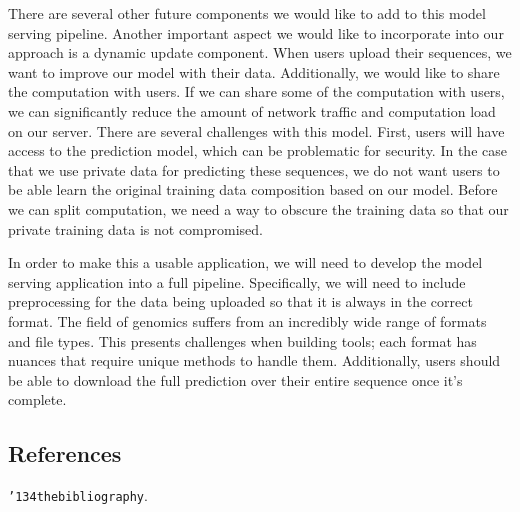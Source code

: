 \documentclass{sig-alternate-05-2015}
\begin{document}
There are several other future components we would like to add to this model serving pipeline. Another important aspect we would like to incorporate into our approach is a dynamic update component. When users upload their sequences, we want to improve our model with their data. Additionally, we would like to share the computation with users. If we can share some of the computation with users, we can significantly reduce the amount of network traffic and computation load on our server. There are several challenges with this model. First, users will have access to the prediction model, which can be problematic for security. In the case that we use private data for predicting these sequences, we do not want users to be able learn the original training data composition based on our model. Before we can split computation, we need a way to obscure the training data so that our private training data is not compromised.

In order to make this a usable application, we will need to develop the model serving application into a full pipeline. Specifically, we will need to include preprocessing for the data being uploaded so that it is always in the correct format. The field of genomics suffers from an incredibly wide range of formats and file types. This presents challenges when building tools; each format has nuances that require unique methods to handle them. Additionally, users should be able to download the full prediction over their entire sequence once it's complete.



\subsection{References}
\texttt{{\char'134}thebibliography}.
\end{document}
